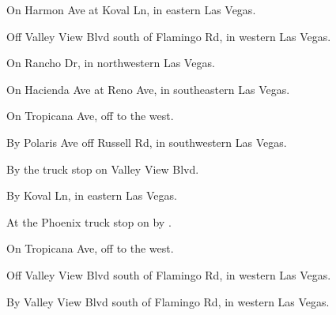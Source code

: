 

\begin{LocationList}

On Harmon Ave at Koval Ln, in eastern Las Vegas.

Off Valley View Blvd south of Flamingo Rd, in western Las Vegas.

On Rancho Dr, in northwestern Las Vegas.

On Hacienda Ave at Reno Ave, in southeastern Las Vegas.

On Tropicana Ave, off   to the west.

By Polaris Ave off Russell Rd, in southwestern Las Vegas.

\Location{\GarageHQ \Garage}
By the truck stop on Valley View Blvd.

By Koval Ln, in eastern Las Vegas.

At the Phoenix truck stop on  by  .

\Location{\RecruitmentAgency \Recruitment}
On Tropicana Ave, off   to the west.

Off Valley View Blvd south of Flamingo Rd, in western Las Vegas.

By Valley View Blvd south of Flamingo Rd, in western Las Vegas.

\end{LocationList}

